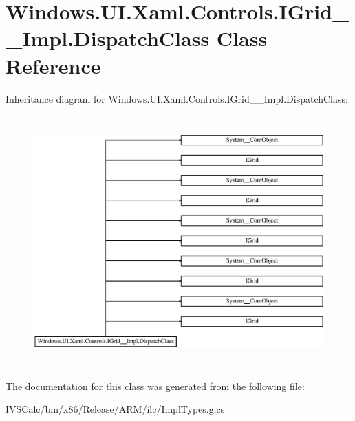 \hypertarget{class_windows_1_1_u_i_1_1_xaml_1_1_controls_1_1_i_grid_____impl_1_1_dispatch_class}{}\section{Windows.\+U\+I.\+Xaml.\+Controls.\+I\+Grid\+\_\+\+\_\+\+Impl.\+Dispatch\+Class Class Reference}
\label{class_windows_1_1_u_i_1_1_xaml_1_1_controls_1_1_i_grid_____impl_1_1_dispatch_class}
Inheritance diagram for Windows.\+U\+I.\+Xaml.\+Controls.\+I\+Grid\+\_\+\+\_\+\+Impl.\+Dispatch\+Class\+:\begin{figure}[H]
\begin{center}
\leavevmode
\includegraphics[height=9.655172cm]{class_windows_1_1_u_i_1_1_xaml_1_1_controls_1_1_i_grid_____impl_1_1_dispatch_class}
\end{center}
\end{figure}


The documentation for this class was generated from the following file\+:\begin{DoxyCompactItemize}
\item 
I\+V\+S\+Calc/bin/x86/\+Release/\+A\+R\+M/ilc/Impl\+Types.\+g.\+cs\end{DoxyCompactItemize}
